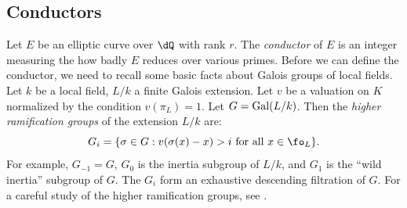 %
%







\subsection{Conductors}

Let $E$ be an elliptic curve over $\dQ$ with rank $r$. The \emph{conductor} of 
$E$ is an integer measuring the how badly $E$ reduces over various primes. 
Before we can define the conductor, we need to recall some basic facts about 
Galois groups of local fields. Let $k$ be a local field, $L/k$ a finite Galois 
extension. Let $v$ be a valuation on $K$ normalized by the condition 
$v(\pi_L)=1$. Let $G=\operatorname{Gal}(L/k)$. Then the \emph{higher ramification groups} of 
the extension $L/k$ are:
\[
  G_i = \{\sigma\in G : v(\sigma (x)-x) > i\text{ for all $x\in \fo_L$}\} \text{.}
\]
For example, $G_{-1}=G$, $G_0$ is the inertia subgroup of $L/k$, and $G_1$ is 
the ``wild inertia'' subgroup of $G$. The $G_i$ form an exhaustive descending 
filtration of $G$. For a careful study of the higher ramification groups, see 
\cite[IV]{se79}. 

